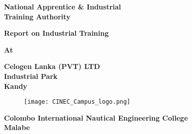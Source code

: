 \documentclass[a4paper,12pt]{article}
\begin{document}
	
	\begin{titlepage}
		\begin{center}
		
			\begin{huge}
				{\bf
				National Apprentice \& Industrial \\
				\smallskip
				Training Authority
				}
			\end{huge}
			
			\vspace{1cm}
			
				\begin{LARGE}
					{\bf
						Report on Industrial Training
					}
				\end{LARGE}
			
			\vspace{1cm}
			 
				\begin{Large}
					{\bf
						At
					}
				\end{Large}
			
			\vspace{1cm}
				
				\begin{LARGE}
					{\bf
						Celogen Lanka (PVT) LTD\\
						
						Industrial Park\\
						\vspace{0.4cm}
						Kandy
					}
				\end{LARGE}
				
				
			\vspace{2cm}			
			
			
				\begin{figure}[H]
					\begin{center}
						\texttt{[image: CINEC\_Campus\_logo.png]}
					\end{center}
				\end{figure}
			
			
			\vspace{2cm}
				
			\begin{Large}
				{\bf
					Colombo International Nautical Engineering College
					\\
					\vspace{0.4cm}
					Malabe
				}
			\end{Large}
		\end{center}
	

\end{titlepage}
\end{document}
